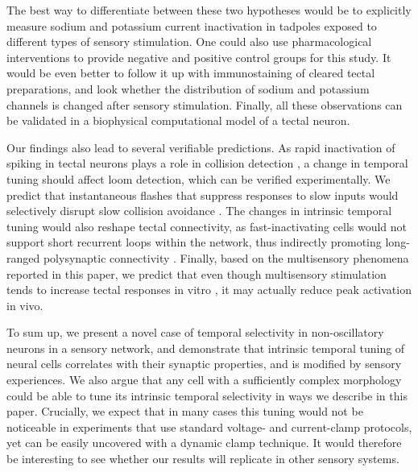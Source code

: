 \documentclass{article}
\begin{document}
The best way to differentiate between these two hypotheses would be to explicitly measure sodium and potassium current inactivation \citep{zbili2019axonnav} in tadpoles exposed to different types of sensory stimulation. One could also use pharmacological interventions to provide negative and positive control groups for this study. It would be even better to follow it up with immunostaining of cleared tectal preparations, and look whether the distribution of sodium and potassium channels is changed after sensory stimulation. Finally, all these observations can be validated in a biophysical computational model of a tectal neuron.

Our findings also lead to several verifiable predictions. As rapid inactivation of spiking in tectal neurons plays a role in collision detection \citep{khakhalin2014, jang2016}, a change in temporal tuning should affect loom detection, which can be verified experimentally. We predict that instantaneous flashes that suppress responses to slow inputs would selectively disrupt slow collision avoidance \citep{khakhalin2014}. The changes in intrinsic temporal tuning would also reshape tectal connectivity, as fast-inactivating cells would not support short recurrent loops within the network, thus indirectly promoting long-ranged polysynaptic connectivity \citep{fiete2010stdp, clopath2010stdp, khakhalin2019graph}. Finally, based on the multisensory phenomena reported in this paper, we predict that even though multisensory stimulation tends to increase tectal responses in vitro \citep{felch2016,truszkowski2017}, it may actually reduce peak activation in vivo.


To sum up, we present a novel case of temporal selectivity in non-oscillatory neurons in a sensory network, and demonstrate that intrinsic temporal tuning of neural cells correlates with their synaptic properties, and is modified by sensory experiences. We also argue that any cell with a sufficiently complex morphology could be able to tune its intrinsic temporal selectivity in ways we describe in this paper. Crucially, we expect that in many cases this tuning would not be noticeable in experiments that use standard voltage- and current-clamp protocols, yet can be easily uncovered with a dynamic clamp technique. It would therefore be interesting to see whether our results will replicate in other sensory systems.
\end{document}
